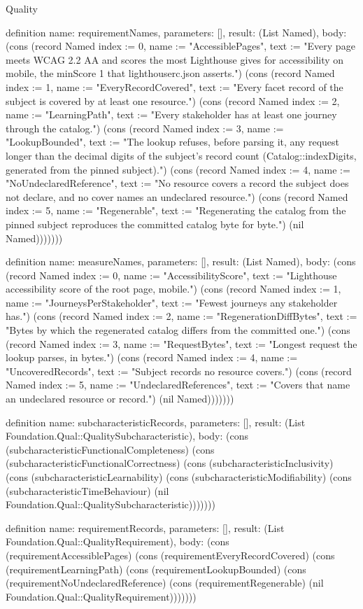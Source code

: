 \begin{lexlean}{Quality}
\begin{semanticmodule}
definition{
  name: requirementNames,
  parameters: [],
  result: (List Named),
  body: (cons (record Named {index := 0, name := "AccessiblePages", text := "Every page meets WCAG 2.2 AA and scores the most Lighthouse gives for accessibility on mobile, the minScore 1 that lighthouserc.json asserts."}) (cons (record Named {index := 1, name := "EveryRecordCovered", text := "Every facet record of the subject is covered by at least one resource."}) (cons (record Named {index := 2, name := "LearningPath", text := "Every stakeholder has at least one journey through the catalog."}) (cons (record Named {index := 3, name := "LookupBounded", text := "The lookup refuses, before parsing it, any request longer than the decimal digits of the subject's record count (Catalog::indexDigits, generated from the pinned subject)."}) (cons (record Named {index := 4, name := "NoUndeclaredReference", text := "No resource covers a record the subject does not declare, and no cover names an undeclared resource."}) (cons (record Named {index := 5, name := "Regenerable", text := "Regenerating the catalog from the pinned subject reproduces the committed catalog byte for byte."}) (nil Named)))))))
}

definition{
  name: measureNames,
  parameters: [],
  result: (List Named),
  body: (cons (record Named {index := 0, name := "AccessibilityScore", text := "Lighthouse accessibility score of the root page, mobile."}) (cons (record Named {index := 1, name := "JourneysPerStakeholder", text := "Fewest journeys any stakeholder has."}) (cons (record Named {index := 2, name := "RegenerationDiffBytes", text := "Bytes by which the regenerated catalog differs from the committed one."}) (cons (record Named {index := 3, name := "RequestBytes", text := "Longest request the lookup parses, in bytes."}) (cons (record Named {index := 4, name := "UncoveredRecords", text := "Subject records no resource covers."}) (cons (record Named {index := 5, name := "UndeclaredReferences", text := "Covers that name an undeclared resource or record."}) (nil Named)))))))
}

definition{
  name: subcharacteristicRecords,
  parameters: [],
  result: (List Foundation.Qual::QualitySubcharacteristic),
  body: (cons (subcharacteristicFunctionalCompleteness) (cons (subcharacteristicFunctionalCorrectness) (cons (subcharacteristicInclusivity) (cons (subcharacteristicLearnability) (cons (subcharacteristicModifiability) (cons (subcharacteristicTimeBehaviour) (nil Foundation.Qual::QualitySubcharacteristic)))))))
}

definition{
  name: requirementRecords,
  parameters: [],
  result: (List Foundation.Qual::QualityRequirement),
  body: (cons (requirementAccessiblePages) (cons (requirementEveryRecordCovered) (cons (requirementLearningPath) (cons (requirementLookupBounded) (cons (requirementNoUndeclaredReference) (cons (requirementRegenerable) (nil Foundation.Qual::QualityRequirement)))))))
}


\end{semanticmodule}
\end{lexlean}
